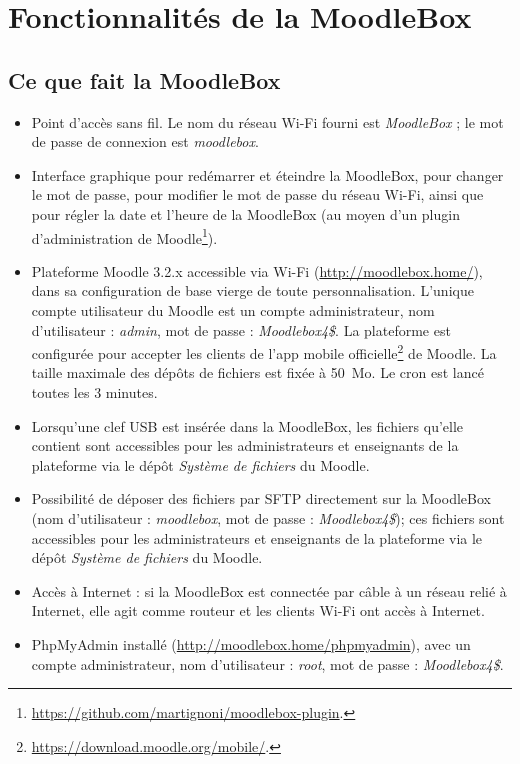 \documentclass[11pt]{article}
\begin{document}
\section{Fonctionnalités de la MoodleBox}

\subsection{Ce que fait la MoodleBox}

\begin{itemize}
\item Point d'accès sans fil. Le nom du réseau Wi-Fi fourni est \emph{MoodleBox} ; le mot de passe de connexion est \emph{moodlebox}.
\item Interface graphique pour redémarrer et éteindre la MoodleBox, pour changer le mot de passe, pour modifier le mot de passe du réseau Wi-Fi, ainsi que pour régler la date et l'heure de la MoodleBox (au moyen d'un plugin d'administration de Moodle\footnote{\url{https://github.com/martignoni/moodlebox-plugin}.}).
\item Plateforme Moodle 3.2.x accessible via Wi-Fi (\url{http://moodlebox.home/}), dans sa configuration de base vierge de toute personnalisation. L'unique compte utilisateur du Moodle est un compte administrateur, nom d'utilisateur : \emph{admin}, mot de passe : \emph{Moodlebox4\$}. La plateforme est configurée pour accepter les clients de l'app mobile officielle\footnote{\url{https://download.moodle.org/mobile/}.} de Moodle. La taille maximale des dépôts de fichiers est fixée à 50~Mo. Le cron est lancé toutes les 3 minutes.
\item Lorsqu'une clef USB est insérée dans la MoodleBox, les fichiers qu'elle contient sont accessibles pour les administrateurs et enseignants de la plateforme via le dépôt \emph{Système de fichiers} du Moodle.
\item Possibilité de déposer des fichiers par SFTP directement sur la MoodleBox (nom d'utilisateur : \emph{moodlebox}, mot de passe : \emph{Moodlebox4\$}); ces fichiers sont accessibles pour les administrateurs et enseignants de la plateforme via le dépôt \emph{Système de fichiers} du Moodle.
\item Accès à Internet : si la MoodleBox est connectée par câble à un réseau relié à Internet, elle agit comme routeur et les clients Wi-Fi ont accès à Internet.
\item PhpMyAdmin installé (\url{http://moodlebox.home/phpmyadmin}), avec un compte administrateur, nom d'utilisateur : \emph{root}, mot de passe : \emph{Moodlebox4\$}.
\end{itemize}
\end{document}
